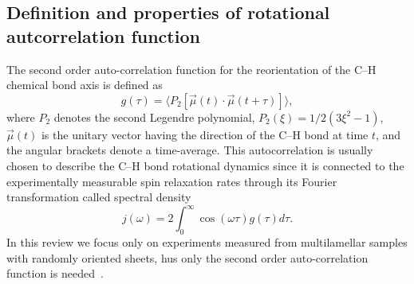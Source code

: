 \documentclass[aps,prl,superscriptaddress,twocolumn]{revtex4}
\begin{document}

\subsection{Definition and properties of rotational autcorrelation function}
The second order auto-correlation function for the reorientation of the C--H chemical bond axis is defined as \cite{Lip82:4546}
\begin{equation}\label{gt}
g(\tau) = \langle P_2[\vec{\mu}(t)\cdot\vec{\mu}(t+\tau)]\rangle,
\end{equation} 
where $P_2$ denotes the second Legendre polynomial, $P_2(\xi) = 1/2 (3\xi^2 - 1)$, $\vec{\mu}(t)$ is the unitary vector having the 
direction of the C--H bond at time $t$, and the angular brackets denote a time-average. This autocorrelation is usually chosen
to describe the C--H bond rotational dynamics since it is connected to the experimentally measurable spin relaxation rates 
through its Fourier transformation called spectral density
\begin{equation}\label{FT}
j(\omega) =  2\int_0^{\infty} \cos(\omega \tau) g(\tau) d\tau.
\end{equation}
In this review we focus only on experiments measured from multilamellar samples with randomly oriented sheets, 
hus only the second order auto-correlation function is needed~\cite{??}. 
\end{document}
